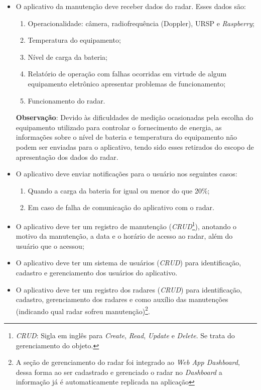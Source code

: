 \begin{itemize}
    \item O aplicativo da manutenção deve receber dados do radar. Esses dados são:
    \begin{enumerate}
        \item Operacionalidade: câmera, radiofrequência (Doppler), URSP e \textit{Raspberry};
        \item Temperatura do equipamento;
        \item Nível de carga da bateria;
        \item Relatório de operação com falhas ocorridas em virtude de algum equipamento eletrônico apresentar problemas de funcionamento;
        \item Funcionamento do radar.
    \end{enumerate}
    
    \textbf{Observação}: Devido às dificuldades de medição ocasionadas pela escolha do equipamento utilizado para controlar o fornecimento de energia, as informações sobre o nível de bateria e temperatura do equipamento não podem ser enviadas para o aplicativo, tendo sido esses retirados do escopo de apresentação dos dados do radar.

    \item O aplicativo deve enviar notificações para o usuário nos seguintes casos:
    \begin{enumerate}
        \item Quando a carga da bateria for igual ou menor do que 20\%;
        \item Em caso de falha de comunicação do aplicativo com o radar.
    \end{enumerate}
    
    \item O aplicativo deve ter um registro de manutenção (\textit{CRUD}\footnote{\textit{CRUD}: Sigla em inglês para \textit{Create}, \textit{Read}, \textit{Update} e \textit{Delete}. Se trata do gerenciamento do objeto.}), anotando o motivo da manutenção, a data e o horário de acesso ao radar, além do usuário que o acessou;
    \item O aplicativo deve ter um sistema de usuários (\textit{CRUD}) para identificação, cadastro e gerenciamento dos usuários do aplicativo.
    \item O aplicativo deve ter um registro dos radares (\textit{CRUD}) para identificação, cadastro, gerenciamento dos radares e como auxílio das manutenções (indicando qual radar sofreu manutenção)\footnote{A seção de gerenciamento do radar foi integrado ao \textit{Web App Dashboard}, dessa forma ao ser cadastrado e gerenciado o radar no \textit{Dashboard} a informação já é automaticamente replicada na aplicação}.
\end{itemize}

